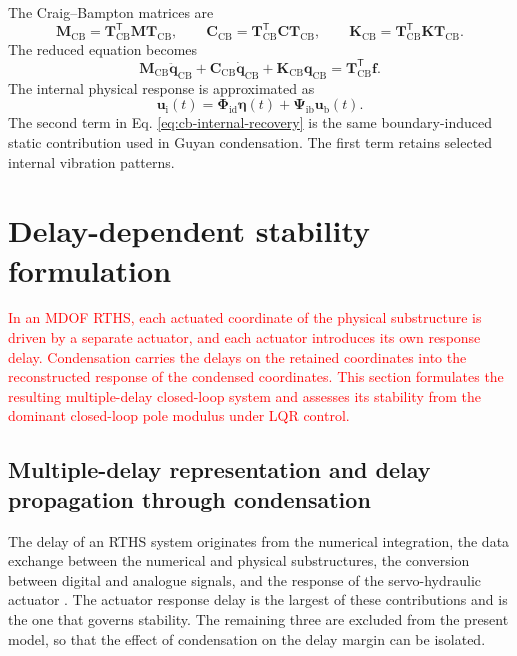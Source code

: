\documentclass[11pt,a4paper]{article}
\numberwithin{equation}{section}
\newcommand{\rev}[1]{\textcolor{red}{#1}}
\begin{document}
The Craig--Bampton matrices are
\begin{equation}
	\mathbf{M}_{\mathrm{CB}}=\mathbf{T}_{\mathrm{CB}}^{\mathsf{T}}\mathbf{M}\mathbf{T}_{\mathrm{CB}},
	\qquad
	\mathbf{C}_{\mathrm{CB}}=\mathbf{T}_{\mathrm{CB}}^{\mathsf{T}}\mathbf{C}\mathbf{T}_{\mathrm{CB}},
	\qquad
	\mathbf{K}_{\mathrm{CB}}=\mathbf{T}_{\mathrm{CB}}^{\mathsf{T}}\mathbf{K}\mathbf{T}_{\mathrm{CB}}.
	\label{eq:cb-reduced-matrices}
\end{equation}
The reduced equation becomes
\begin{equation}
	\mathbf{M}_{\mathrm{CB}}\ddot{\bm{q}}_{\mathrm{CB}}
	+\mathbf{C}_{\mathrm{CB}}\dot{\bm{q}}_{\mathrm{CB}}
	+\mathbf{K}_{\mathrm{CB}}\bm{q}_{\mathrm{CB}}
	=\mathbf{T}_{\mathrm{CB}}^{\mathsf{T}}\bm{f}.
	\label{eq:cb-reduced-eom}
\end{equation}
The internal physical response is approximated as
\begin{equation}
	\bm{u}_{\mathrm{i}}(t)=
	\bm{\Phi}_{\mathrm{id}}\bm{\eta}(t)
	+\bm{\Psi}_{\mathrm{ib}}\bm{u}_{\mathrm{b}}(t).
	\label{eq:cb-internal-recovery}
\end{equation}
The second term in Eq. \eqref{eq:cb-internal-recovery} is the same boundary-induced static contribution used in Guyan condensation. The first term retains selected internal vibration patterns.



\section{Delay-dependent stability formulation} \label{sec3}

\rev{In an MDOF RTHS, each actuated coordinate of the physical substructure is driven by a separate actuator, and each actuator introduces its own response delay. Condensation carries the delays on the retained coordinates into the reconstructed response of the condensed coordinates. This section formulates the resulting multiple-delay closed-loop system and assesses its stability from the dominant closed-loop pole modulus under LQR control.}

\subsection{Multiple-delay representation and delay propagation through condensation}
\label{sec:multiple-delay}

The delay of an RTHS system originates from the numerical integration, the data exchange between the numerical and physical substructures, the conversion between digital and analogue signals, and the response of the servo-hydraulic actuator \cite{Carrion2007}. The actuator response delay is the largest of these contributions and is the one that governs stability. The remaining three are excluded from the present model, so that the effect of condensation on the delay margin can be isolated.
\end{document}
